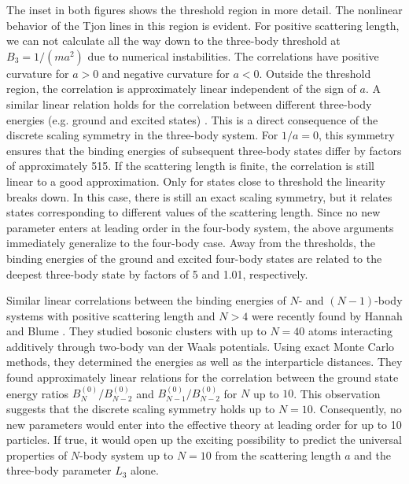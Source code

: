 \documentclass[prc,preprint,showpacs,tightenlines,%
nofootinbib]{revtex4}
\begin{document}
The inset in both figures shows the threshold region in more detail. 
The nonlinear behavior of the Tjon lines in this region is evident.
For positive scattering length, we can not calculate
all the way down to the three-body threshold at $B_3=1/(ma^2)$
due to numerical instabilities.
The correlations have positive curvature for $a>0$ and negative
curvature for $a<0$.
Outside the threshold region, the correlation is approximately linear
independent of the sign of $a$.
A similar linear relation holds for the correlation 
between different three-body energies (e.g. ground and excited states)
\cite{Braaten:2004rn}. This is a direct consequence of the discrete
scaling symmetry in the three-body system. For $1/a=0$, this 
symmetry ensures that the binding energies of subsequent three-body
states differ by factors of approximately 515. If the scattering length
is finite, the correlation is still linear to a good approximation.
Only for states close to threshold the linearity breaks down. In this case,
there is still an exact scaling symmetry, but it relates states
corresponding to different values of the scattering length.
Since no new parameter enters at leading order in the four-body system,
the above arguments immediately generalize to the four-body case.
Away from the thresholds, the binding energies of the ground
and excited four-body states are related to the deepest three-body
state by factors of 5 and 1.01, respectively. 

Similar linear correlations between the binding energies of
$N$- and $(N-1)$-body systems with positive scattering length
and $N>4$ were recently found 
by Hannah and Blume \cite{Hanna06}. They studied bosonic clusters
with up to $N=40$ atoms interacting additively through two-body
van der Waals potentials. Using exact Monte Carlo methods, they
determined the energies as well as the interparticle distances.
They found approximately linear relations for the correlation
between the ground state energy ratios $B^{(0)}_{N}/B^{(0)}_{N-2}$ and 
$B^{(0)}_{N-1}/B^{(0)}_{N-2}$ for $N$ up to $10$. This observation
suggests that the discrete scaling symmetry holds up to $N=10$. 
Consequently, no new parameters would enter into the effective theory 
at leading order for up to 10 particles.
If true, it would open up the exciting possibility to predict 
the universal properties of $N$-body system up to $N=10$ from
the scattering length $a$ and the three-body parameter $L_3$ alone.

%
\end{document}
